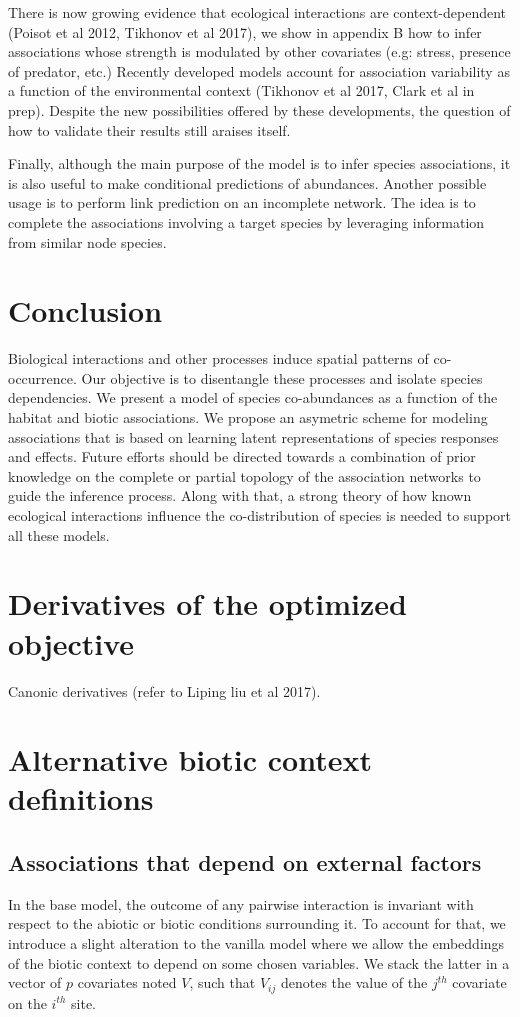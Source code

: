 \documentclass[]{article}
\begin{document}
There is now growing evidence that ecological interactions are context-dependent (Poisot et al 2012, Tikhonov et al 2017), we show in appendix B how to infer associations whose strength is modulated by other covariates (e.g: stress, presence of predator, etc.) Recently developed models account for association variability as a function of the environmental context (Tikhonov et al 2017, Clark et al in prep). Despite the new possibilities offered by these developments, the question of how to validate their results still araises itself.

Finally, although the main purpose of the model is to infer species associations, it is also useful to make conditional predictions of abundances. Another possible usage is to perform link prediction on an incomplete network. The idea is to complete the associations involving a target species by leveraging information from similar node species. \\ 
          
 
\section{Conclusion}
Biological interactions and other processes induce spatial patterns of co-occurrence. Our objective is to disentangle these processes and isolate species dependencies. We present a model of species co-abundances as a function of the habitat and biotic associations. We propose an asymetric scheme for modeling associations that is based on learning latent representations of species responses and effects. Future efforts should be directed towards a combination of prior knowledge on the complete or partial topology of the association networks to guide the inference process. Along with that, a strong theory of how known ecological interactions influence the co-distribution of species is needed to support all these models.   

\appendix

\section{Derivatives of the optimized objective}
\label{sec:derivatives}
Canonic derivatives (refer to Liping liu et al 2017). 

\section{Alternative biotic context definitions}
\label{sec:alt-bio}
\subsection{Associations that depend on external factors}
In the base model, the outcome of any pairwise interaction is invariant with respect to the abiotic or biotic conditions surrounding it. To account for that, we introduce a slight alteration to the vanilla model where we allow the embeddings of the biotic context to depend on some chosen variables. We stack the latter in a vector of $p$ covariates noted $V$, such that $V_{ij}$ denotes the value of the $j^{th}$ covariate on the $i^{th}$ site. 
\end{document}
